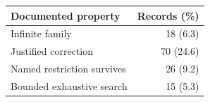 \begin{tabular}{lr}
\toprule
Documented property & Records (\%) \\
\midrule
Infinite family & 18 (6.3) \\
Justified correction & 70 (24.6) \\
Named restriction survives & 26 (9.2) \\
Bounded exhaustive search & 15 (5.3) \\
\bottomrule
\end{tabular}

